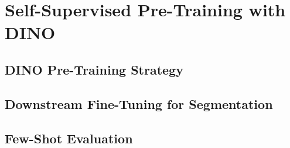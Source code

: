 \section{Self-Supervised Pre-Training with DINO}
\label{sec:dino}


\subsection{DINO Pre-Training Strategy}

\subsection{Downstream Fine-Tuning for Segmentation}

\subsection{Few-Shot Evaluation}
